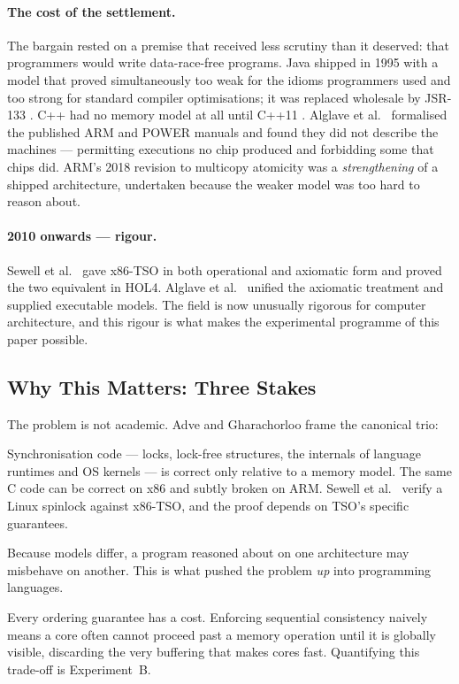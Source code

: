 \paragraph{The cost of the settlement.}
The bargain rested on a premise that received less scrutiny than it deserved:
that programmers would write data-race-free programs.
Java shipped in 1995 with a model that proved simultaneously too weak for the
idioms programmers used and too strong for standard compiler optimisations; it
was replaced wholesale by JSR-133 \cite{manson2005java}.
C++ had no memory model at all until C++11 \cite{boehm2008foundations}.
Alglave et al.\ \cite{alglave2014herding} formalised the published ARM and POWER
manuals and found they did not describe the machines --- permitting executions
no chip produced and forbidding some that chips did.
ARM's 2018 revision to multicopy atomicity was a \emph{strengthening} of a
shipped architecture, undertaken because the weaker model was too hard to reason
about.

\paragraph{2010 onwards --- rigour.}
Sewell et al.\ \cite{sewell2010x86tso} gave x86-TSO in both operational and
axiomatic form and proved the two equivalent in HOL4.
Alglave et al.\ \cite{alglave2014herding} unified the axiomatic treatment and
supplied executable models.
The field is now unusually rigorous for computer architecture, and this rigour
is what makes the experimental programme of this paper possible.

\subsection{Why This Matters: Three Stakes}

The problem is not academic.
Adve and Gharachorloo \cite{adve1996shared} frame the canonical trio:

\begin{description}[leftmargin=1.9cm,style=nextline,font=\normalfont\bfseries]
\item[Correctness] Synchronisation code --- locks, lock-free structures, the
  internals of language runtimes and OS kernels --- is correct only relative to
  a memory model. The same C code can be correct on x86 and subtly broken on
  ARM. Sewell et al.\ \cite{sewell2010x86tso} verify a Linux spinlock against
  x86-TSO, and the proof depends on TSO's specific guarantees.
\item[Portability] Because models differ, a program reasoned about on one
  architecture may misbehave on another. This is what pushed the problem
  \emph{up} into programming languages.
\item[Performance] Every ordering guarantee has a cost. Enforcing sequential
  consistency naively means a core often cannot proceed past a memory operation
  until it is globally visible, discarding the very buffering that makes cores
  fast. Quantifying this trade-off is Experiment~B.
\end{description}


